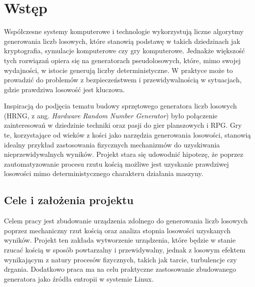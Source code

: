 \chapter{Wstęp}\label{ch:wstep}



Współczesne systemy komputerowe i technologie wykorzystują liczne algorytmy generowania liczb losowych, które stanowią podstawę w takich dziedzinach jak kryptografia,
symulacje komputerowe czy gry komputerowe.
Jednakże większość tych rozwiązań opiera się na generatorach pseudolosowych,
które, mimo swojej wydajności, w istocie generują liczby deterministyczne.
W praktyce może to prowadzić do problemów z bezpieczeństwem i przewidywalnością w sytuacjach, gdzie prawdziwa losowość jest kluczowa.

Inspiracją do podjęcia tematu budowy sprzętowego generatora liczb losowych (HRNG, z ang. \textit{Hardware Random Number Generator})
było połączenie zainteresowań w dziedzinie techniki oraz pasji do gier planszowych i RPG. %
Gry te, korzystające od wieków z kości jako narzędzia generowania losowości, stanowią idealny przykład zastosowania fizycznych mechanizmów do uzyskiwania nieprzewidywalnych wyników.
Projekt stara się udowodnić hipotezę, że poprzez zautomatyzowanie procesu rzutu kością możliwe jest uzyskanie prawdziwej losowości mimo deterministycznego charakteru działania maszyny.

\section{Cele i założenia projektu}\label{sec:cel-projektu}

Celem pracy jest zbudowanie urządzenia zdolnego do generowania liczb losowych poprzez mechaniczny rzut kością oraz analiza stopnia losowości uzyskanych wyników.
Projekt ten zakłada wytworzenie urządzenia, które będzie w stanie rzucać kością w sposób powtarzalny i przewidywalny,
jednak z losowym efektem wynikającym z natury procesów fizycznych, takich jak tarcie, turbulencje czy drgania.
Dodatkowo praca ma na celu praktyczne zastosowanie zbudowanego generatora jako źródła entropii w systemie Linux.

